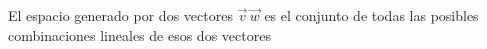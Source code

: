 \documentclass[preview]{standalone}
\begin{document}
\begin{center}
El espacio generado por dos vectores $\vec{v} \, \vec{w}$ es el conjunto de todas las posibles combinaciones lineales de esos dos vectores
\end{center}
\end{document}
